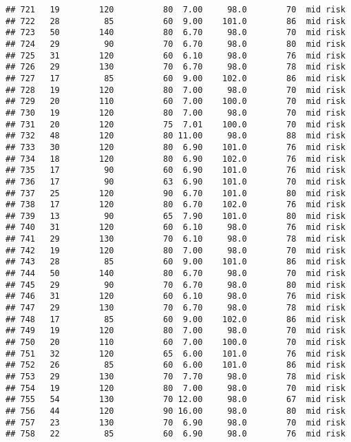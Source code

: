 \documentclass[
  ignorenonframetext,
]{beamer}
\begin{document}
\begin{frame}[fragile]
\begin{verbatim}
## 721   19        120          80  7.00     98.0        70  mid risk
## 722   28         85          60  9.00    101.0        86  mid risk
## 723   50        140          80  6.70     98.0        70  mid risk
## 724   29         90          70  6.70     98.0        80  mid risk
## 725   31        120          60  6.10     98.0        76  mid risk
## 726   29        130          70  6.70     98.0        78  mid risk
## 727   17         85          60  9.00    102.0        86  mid risk
## 728   19        120          80  7.00     98.0        70  mid risk
## 729   20        110          60  7.00    100.0        70  mid risk
## 730   19        120          80  7.00     98.0        70  mid risk
## 731   20        120          75  7.01    100.0        70  mid risk
## 732   48        120          80 11.00     98.0        88  mid risk
## 733   30        120          80  6.90    101.0        76  mid risk
## 734   18        120          80  6.90    102.0        76  mid risk
## 735   17         90          60  6.90    101.0        76  mid risk
## 736   17         90          63  6.90    101.0        70  mid risk
## 737   25        120          90  6.70    101.0        80  mid risk
## 738   17        120          80  6.70    102.0        76  mid risk
## 739   13         90          65  7.90    101.0        80  mid risk
## 740   31        120          60  6.10     98.0        76  mid risk
## 741   29        130          70  6.10     98.0        78  mid risk
## 742   19        120          80  7.00     98.0        70  mid risk
## 743   28         85          60  9.00    101.0        86  mid risk
## 744   50        140          80  6.70     98.0        70  mid risk
## 745   29         90          70  6.70     98.0        80  mid risk
## 746   31        120          60  6.10     98.0        76  mid risk
## 747   29        130          70  6.70     98.0        78  mid risk
## 748   17         85          60  9.00    102.0        86  mid risk
## 749   19        120          80  7.00     98.0        70  mid risk
## 750   20        110          60  7.00    100.0        70  mid risk
## 751   32        120          65  6.00    101.0        76  mid risk
## 752   26         85          60  6.00    101.0        86  mid risk
## 753   29        130          70  7.70     98.0        78  mid risk
## 754   19        120          80  7.00     98.0        70  mid risk
## 755   54        130          70 12.00     98.0        67  mid risk
## 756   44        120          90 16.00     98.0        80  mid risk
## 757   23        130          70  6.90     98.0        70  mid risk
## 758   22         85          60  6.90     98.0        76  mid risk

\end{verbatim}
\end{frame}
\end{document}
